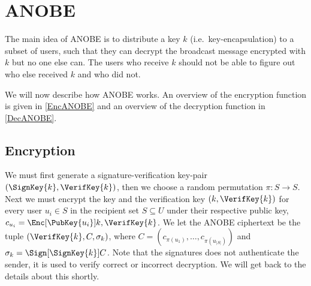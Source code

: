 \section{\Acl{ANOBE}}\label{ANOBE}

The main idea of \ac{ANOBE} is to distribute a key \(k\) (i.e.\ 
key-encapsulation) to a subset of users, such that they can decrypt the 
broadcast message encrypted with \(k\) but no one else can.
The users who receive \(k\) should not be able to figure out who else received 
\(k\) and who did not.

We will now describe how \ac{ANOBE} works.
An overview of the encryption function is given in \cref{EncANOBE} and an 
overview of the decryption function in \cref{DecANOBE}.

\subsection{Encryption}

We must first generate a signature-verification key-pair \((\SignKey{k}, 
  \VerifKey{k})\), then we choose a random permutation \(\pi\colon S\to S\).
Next we must encrypt the key and the verification key \((k, \VerifKey{k})\) for 
every user \(u_i\in S\) in the recipient set \(S\subseteq U\) under their 
respective public key, \(c_{u_i} = \Enc[\PubKey{u_i}]{k, \VerifKey{k}}\).
We let the \ac{ANOBE} ciphertext be the tuple \((\VerifKey{k}, C, \sigma_k)\), 
where
\(C = ( c_{\pi(u_1)}, \ldots, c_{\pi(u_{|S|})})\) and
\(\sigma_k = \Sign[\SignKey{k}]{ C }\).
Note that the signatures does not authenticate the sender, it is used to verify 
correct or incorrect decryption.
We will get back to the details about this shortly.

